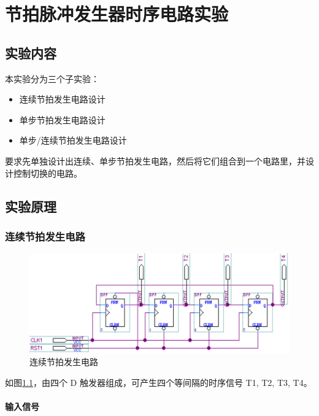 \chapter{节拍脉冲发生器时序电路实验}

\section{实验内容}

本实验分为三个子实验：

\begin{itemize}
    \item 连续节拍发生电路设计
    \item 单步节拍发生电路设计
    \item 单步/连续节拍发生电路设计
\end{itemize}

要求先单独设计出连续、单步节拍发生电路，然后将它们组合到一个电路里，并设计控制切换的电路。

\section{实验原理}

\subsection{连续节拍发生电路}

\begin{figure}[h]
\centering
\includegraphics[width=\textwidth]{images/prin1_1.png}
\caption{连续节拍发生电路}
\label{fig:prin1_1}
\end{figure}

如图\ref{fig:prin1_1}，由四个 D 触发器组成，可产生四个等间隔的时序信号 T1, T2, T3, T4。

\subsubsection{输入信号}

